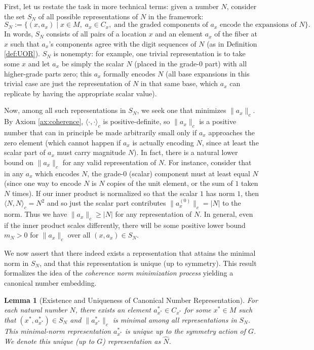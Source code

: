\documentclass[11pt]{article}
\newtheorem{lemma}{Lemma}[section]
\begin{document}
First, let us restate the task in more technical terms: given a number $N$, consider the set $S_N$ of all possible representations of $N$ in the framework:
\[ 
S_N := \Big\{(x, a_x) \;\Big|\; x \in M,\; a_x \in C_x,\; \text{and the graded components of $a_x$ encode the expansions of $N$}\Big\}. 
\] 
In words, $S_N$ consists of all pairs of a location $x$ and an element $a_x$ of the fiber at $x$ such that $a_x$'s components agree with the digit sequences of $N$ (as in Definition \ref{def:UOR}). $S_N$ is nonempty: for example, one trivial representation is to take some $x$ and let $a_x$ be simply the scalar $N$ (placed in the grade-0 part) with all higher-grade parts zero; this $a_x$ formally encodes $N$ (all base expansions in this trivial case are just the representation of $N$ in that same base, which $a_x$ can replicate by having the appropriate scalar value).

Now, among all such representations in $S_N$, we seek one that minimizes $\|a_x\|_c$. By Axiom \ref{ax:coherence}, $\langle\cdot,\cdot\rangle_c$ is positive-definite, so $\|a_x\|_c$ is a positive number that can in principle be made arbitrarily small only if $a_x$ approaches the zero element (which cannot happen if $a_x$ is actually encoding $N$, since at least the scalar part of $a_x$ must carry magnitude $N$). In fact, there is a natural lower bound on $\|a_x\|_c$ for any valid representation of $N$. For instance, consider that in any $a_x$ which encodes $N$, the grade-$0$ (scalar) component must at least equal $N$ (since one way to encode $N$ is $N$ copies of the unit element, or the sum of $1$ taken $N$ times). If our inner product is normalized so that the scalar $1$ has norm $1$, then $\langle N, N \rangle_c = N^2$ and so just the scalar part contributes $\|a_x^{(0)}\|_c = |N|$ to the norm. Thus we have $\|a_x\|_c \ge |N|$ for any representation of $N$. In general, even if the inner product scales differently, there will be some positive lower bound $m_N > 0$ for $\|a_x\|_c$ over all $(x,a_x)\in S_N$.

We now assert that there indeed exists a representation that attains the minimal norm in $S_N$, and that this representation is unique (up to symmetry). This result formalizes the idea of the \emph{coherence norm minimization process} yielding a canonical number embedding.

\begin{lemma}[Existence and Uniqueness of Canonical Number Representation]\label{lem:unique-rep}
For each natural number $N$, there exists an element $a^*_{x^*} \in C_{x^*}$ for some $x^* \in M$ such that $(x^*,a^*_{x^*}) \in S_N$ and $\|a^*_{x^*}\|_c$ is minimal among all representations in $S_N$. This minimal-norm representation $a^*_{x^*}$ is unique up to the symmetry action of $G$. We denote this unique (up to $G$) representation as $\hat{N}$.
\end{lemma}
\end{document}
